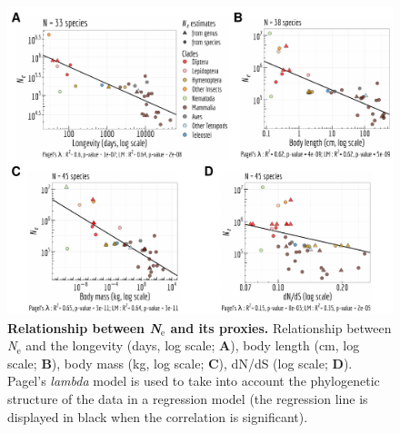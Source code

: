 \begin{figure}[t]
    \centering                                                                            
    \includegraphics[width=\textwidth]{Figure10_supp.pdf}
    \caption[Relationship between \textit{N}$_{\text{e}}$ and its proxies]{\textbf{Relationship between \textit{N}$_{\text{e}}$ and its proxies.} Relationship between \textit{N}$_{\text{e}}$ and the longevity (days, log scale; \textbf{A}), body length (cm, log scale; \textbf{B}), body mass (kg, log scale; \textbf{C}), dN/dS (log scale; \textbf{D}). Pagel's \textit{lambda} model is used to take into account the phylogenetic structure of the data in a regression model (the regression line is displayed in black when the correlation is significant). } 
    \label{suppfig:CU10}
\end{figure}
  

